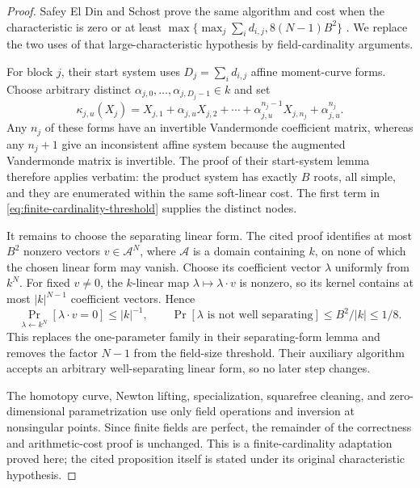 \documentclass[11pt]{article}
\begin{document}
\begin{proof}
Safey El Din and Schost prove the same algorithm and cost when the
characteristic is zero or at least
$\max\{\max_j\sum_i d_{i,j},8(N-1)B^2\}$
\cite[Proposition~5]{SafeyElDinSchost2018}.  We replace the two uses of that
large-characteristic hypothesis by field-cardinality arguments.

For block $j$, their start system uses
$D_j=\sum_i d_{i,j}$ affine moment-curve forms.  Choose arbitrary distinct
$\alpha_{j,0},\ldots,\alpha_{j,D_j-1}\in k$ and set
\[
 \kappa_{j,u}(X_j)=X_{j,1}+\alpha_{j,u}X_{j,2}+
 \cdots+\alpha_{j,u}^{n_j-1}X_{j,n_j}+\alpha_{j,u}^{n_j}.
\]
Any $n_j$ of these forms have an invertible Vandermonde coefficient matrix,
whereas any $n_j+1$ give an inconsistent affine system because the augmented
Vandermonde matrix is invertible.  The proof of their start-system lemma
therefore applies verbatim: the product system has exactly $B$ roots, all
simple, and they are enumerated within the same soft-linear cost.  The first
term in \eqref{eq:finite-cardinality-threshold} supplies the distinct nodes.

It remains to choose the separating linear form.  The cited proof identifies
at most $B^2$ nonzero vectors $v\in\mathcal A^N$, where $\mathcal A$ is a
domain containing $k$, on none of which the chosen linear form may vanish.
Choose its coefficient vector $\lambda$ uniformly from $k^N$.  For fixed
$v\ne0$, the $k$-linear map
$\lambda\mapsto\lambda\mathbin{\cdot}v$ is nonzero, so its kernel contains at
most $|k|^{N-1}$ coefficient vectors.  Hence
\[
 \Pr_{\lambda\leftarrow k^N}[\lambda\mathbin{\cdot}v=0]\le |k|^{-1},
 \qquad
 \Pr[\lambda\text{ is not well separating}]\le B^2/|k|\le1/8.
\]
This replaces the one-parameter family in their separating-form lemma and
removes the factor $N-1$ from the field-size threshold.  Their auxiliary
algorithm accepts an arbitrary well-separating linear form, so no later step
changes.

The homotopy curve, Newton lifting, specialization, squarefree cleaning, and
zero-dimensional parametrization use only field operations and inversion at
nonsingular points.  Since finite fields are perfect, the remainder of the
correctness and arithmetic-cost proof is unchanged.  This is a
finite-cardinality adaptation proved here; the cited proposition itself is
stated under its original characteristic hypothesis.
\end{proof}
\end{document}
